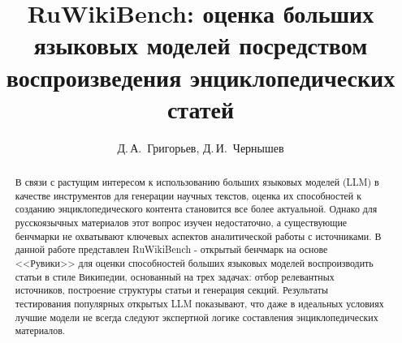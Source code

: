 \documentclass{article}
\begin{document}
\raggedbottom
{}


\title{RuWikiBench: оценка больших языковых моделей посредством воспроизведения энциклопедических статей}

\author{Д.\,А.~Григорьев\Addressmark[1]\Emailmark[1], Д.\,И.~Чернышев\Addressmark[1]\Emailmark[2]}










\maketitle

\begin{abstract}
В связи с растущим интересом к использованию больших языковых моделей (LLM) в качестве инструментов для генерации научных текстов, 
оценка их способностей к созданию энциклопедического контента становится все более актуальной.
Однако для русскоязычных материалов этот вопрос изучен недостаточно, а существующие бенчмарки не охватывают ключевых аспектов аналитической работы с источниками.
В данной работе представлен RuWikiBench - открытый бенчмарк на основе <<Рувики>> для оценки способностей больших языковых моделей воспроизводить статьи в стиле Википедии, 
основанный на трех задачах: отбор релевантных источников, построение структуры статьи и генерация секций.
Результаты тестирования популярных открытых LLM показывают, что даже в идеальных условиях лучшие модели не всегда следуют экспертной логике составления энциклопедических материалов. 
\end{abstract}
\end{document}
